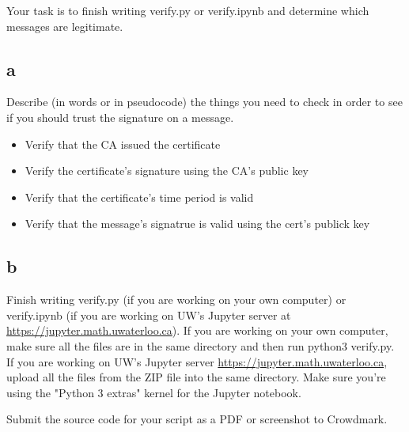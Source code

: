 \documentclass[11pt]{article}
\begin{document}
Your task is to finish writing verify.py or verify.ipynb and determine which messages are legitimate.

\subsection{a}

Describe (in words or in pseudocode) the things you need to check in order to see if you should trust the signature on a message.

\begin{itemize}
  \item Verify that the CA issued the certificate
  \item Verify the certificate's signature using the CA's public key
  \item Verify that the certificate's time period is valid
  \item Verify that the message's signatrue is valid using the cert's publick key 
\end{itemize}

\subsection{b}

Finish writing verify.py (if you are working on your own computer) or verify.ipynb (if you are working on UW's Jupyter server at \url{https://jupyter.math.uwaterloo.ca}). If you are working on your own computer, make sure all the files are in the same directory and then run python3 verify.py.
If you are working on UW's Jupyter server \url{https://jupyter.math.uwaterloo.ca}, upload all the files from the ZIP file into the same directory. Make sure you're using the "Python 3 extras" kernel for the Jupyter notebook.

Submit the source code for your script as a PDF or screenshot to Crowdmark.
\end{document}
